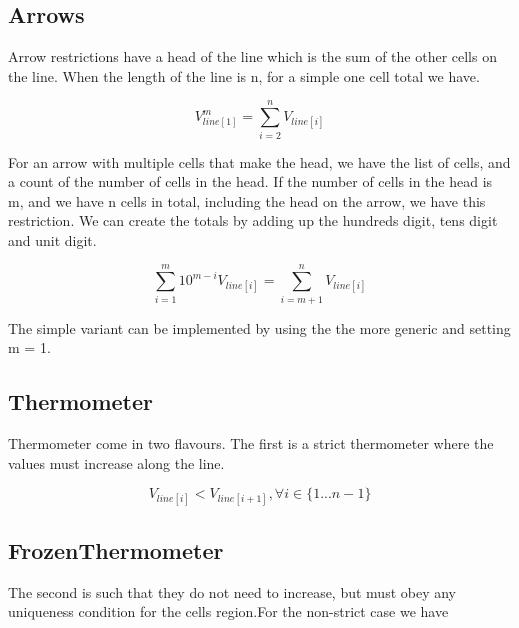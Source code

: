 \documentclass{article}
\begin{document}

\subsection{Arrows}

Arrow restrictions have a head of the line which is the sum of the other cells on the line. When the length of the line is n, for a simple one cell total we have.

\begin{equation}
V_{line[1]}^{m} = \sum_{i=2}^n V_{line[i]}
\end{equation}

For an arrow with multiple cells that make the head, we have the list of cells, and a count of the number of cells in the head. If the number of cells in the head is m, and we have n cells in total, including the head on the arrow, we have
this restriction. We can create the totals by adding up the hundreds digit, tens digit and unit digit. 

\begin{equation}
\sum_{i=1}^m 10^{m-i} V_{line[i]} = \sum_{i=m+1}^n V_{line[i]}
\end{equation}

The simple variant can be implemented by using the the more generic and setting m = 1.


\subsection{Thermometer}

Thermometer come in two flavours. The first is a strict thermometer where the values must increase along the line. 

\begin{equation}
V_{line[i]} < V_{line[i+1]}, \forall i \in \lbrace 1 ... n-1 \rbrace
\end{equation}


\subsection{FrozenThermometer}

The second is such that they do not need to increase, but must obey any uniqueness condition for the cells region.For the non-strict case we have
\end{document}
